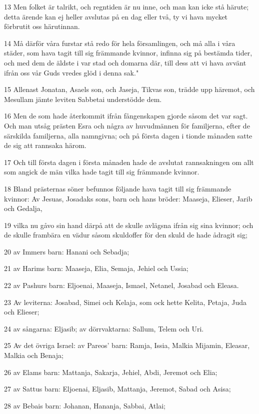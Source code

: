 \par 13 Men folket är talrikt, och regntiden är nu inne, och man kan icke stå härute; detta ärende kan ej heller avslutas på en dag eller två, ty vi hava mycket förbrutit oss härutinnan.
\par 14 Må därför våra furstar stå redo för hela församlingen, och må alla i våra städer, som hava tagit till sig främmande kvinnor, infinna sig på bestämda tider, och med dem de äldste i var stad och domarna där, till dess att vi hava avvänt ifrån oss vår Guds vredes glöd i denna sak."
\par 15 Allenast Jonatan, Asaels son, och Jaseja, Tikvas son, trädde upp häremot, och Mesullam jämte leviten Sabbetai understödde dem.
\par 16 Men de som hade återkommit ifrån fångenskapen gjorde såsom det var sagt. Och man utsåg prästen Esra och några av huvudmännen för familjerna, efter de särskilda familjerna, alla namngivna; och på första dagen i tionde månaden satte de sig att rannsaka härom.
\par 17 Och till första dagen i första månaden hade de avslutat rannsakningen om allt som angick de män vilka hade tagit till sig främmande kvinnor.
\par 18 Bland prästernas söner befunnos följande hava tagit till sig främmande kvinnor: Av Jesuas, Josadaks sons, barn och hans bröder: Maaseja, Elieser, Jarib och Gedalja,
\par 19 vilka nu gåvo sin hand därpå att de skulle avlägsna ifrån sig sina kvinnor; och de skulle frambära en vädur såsom skuldoffer för den skuld de hade ådragit sig;
\par 20 av Immers barn: Hanani och Sebadja;
\par 21 av Harims barn: Maaseja, Elia, Semaja, Jehiel och Ussia;
\par 22 av Pashurs barn: Eljoenai, Maaseja, Ismael, Netanel, Josabad och Eleasa.
\par 23 Av leviterna: Josabad, Simei och Kelaja, som ock hette Kelita, Petaja, Juda och Elieser;
\par 24 av sångarna: Eljasib; av dörrvaktarna: Sallum, Telem och Uri.
\par 25 Av det övriga Israel: av Pareos' barn: Ramja, Issia, Malkia Mijamin, Eleasar, Malkia och Benaja;
\par 26 av Elams barn: Mattanja, Sakarja, Jehiel, Abdi, Jeremot och Elia;
\par 27 av Sattus barn: Eljoenai, Eljasib, Mattanja, Jeremot, Sabad och Asisa;
\par 28 av Bebais barn: Johanan, Hananja, Sabbai, Atlai;
